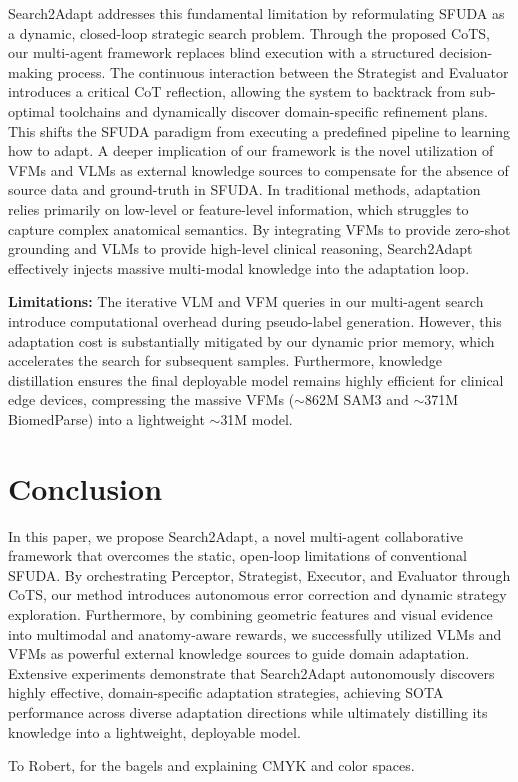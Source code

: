 \documentclass[sigconf, screen]{acmart}
\begin{document}
Search2Adapt addresses this fundamental limitation by reformulating SFUDA as a dynamic, closed-loop strategic search problem. Through the proposed CoTS, our multi-agent framework replaces blind execution with a structured decision-making process. The continuous interaction between the Strategist and Evaluator introduces a critical CoT reflection, allowing the system to backtrack from sub-optimal toolchains and dynamically discover domain-specific refinement plans. This shifts the SFUDA paradigm from executing a predefined pipeline to learning how to adapt. A deeper implication of our framework is the novel utilization of VFMs and VLMs as external knowledge sources to compensate for the absence of source data and ground-truth in SFUDA. In traditional methods, adaptation relies primarily on low-level or feature-level information, which struggles to capture complex anatomical semantics. By integrating VFMs to provide zero-shot grounding and VLMs to provide high-level clinical reasoning, Search2Adapt effectively injects massive multi-modal knowledge into the adaptation loop.

\textbf{Limitations:} The iterative VLM and VFM queries in our multi-agent search introduce computational overhead during pseudo-label generation. However, this adaptation cost is substantially mitigated by our dynamic prior memory, which accelerates the search for subsequent samples. Furthermore, knowledge distillation ensures the final deployable model remains highly efficient for clinical edge devices, compressing the massive VFMs ($\sim$862M SAM3 and $\sim$371M BiomedParse) into a lightweight $\sim$31M model. 

\section{Conclusion}
In this paper, we propose Search2Adapt, a novel multi-agent collaborative framework that overcomes the static, open-loop limitations of conventional SFUDA. By orchestrating Perceptor, Strategist, Executor, and Evaluator through CoTS, our method introduces autonomous error correction and dynamic strategy exploration. Furthermore, by combining geometric features and visual evidence into multimodal and anatomy-aware rewards, we successfully utilized VLMs and VFMs as powerful external knowledge sources to guide domain adaptation. Extensive experiments demonstrate that Search2Adapt autonomously discovers highly effective, domain-specific adaptation strategies, achieving SOTA performance across diverse adaptation directions while ultimately distilling its knowledge into a lightweight, deployable model.

\begin{acks}
To Robert, for the bagels and explaining CMYK and color spaces.
\end{acks}





\end{document}
